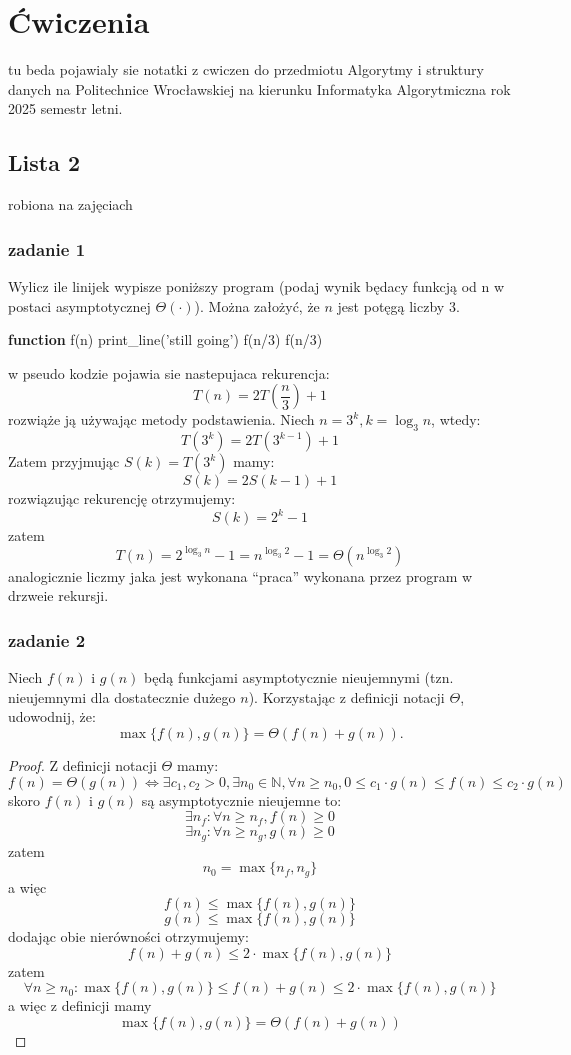 \documentclass[11pt,a4paper]{article}
\begin{document}
\section{Ćwiczenia}
tu beda pojawialy sie notatki z cwiczen do przedmiotu Algorytmy i struktury danych na Politechnice Wrocławskiej na kierunku Informatyka Algorytmiczna rok 2025 semestr letni.

\subsection{Lista 2}
robiona na zajęciach \date{2025-03-10}
\subsubsection{zadanie 1}
Wylicz ile linijek wypisze poniższy program (podaj wynik będacy funkcją od n w postaci asymptotycznej $\Theta(\cdot)$). Można założyć, że $n$ jest potęgą liczby $3$.
\begin{algorithm}
\begin{algorithmic}[1]
\State \textbf{function} f(n)
    \State print\_line('still going')
    \State f(n/3)
    \State f(n/3)
\EndIf
\end{algorithmic}
\end{algorithm}
w pseudo kodzie pojawia sie nastepujaca rekurencja:
\[
    T(n) = 2T(\frac{n}{3}) + 1
\]
rozwiąże ją używając metody podstawienia. Niech $n=3^k, k = \log_3 n$, wtedy:
\[
    T(3^k) = 2T(3^{k-1}) + 1
\]
Zatem przyjmując $S(k) = T(3^k)$ mamy:
\[
    S(k) = 2S(k-1) + 1
\]
rozwiązując rekurencję otrzymujemy:
\[
    S(k) = 2^k - 1
\]
zatem
\[
    T(n) = 2^{\log_3 n} - 1 = n^{\log_3 2} - 1 = \Theta(n^{\log_3 2})
\]
analogicznie liczmy jaka jest wykonana ``praca'' wykonana przez program w drzweie rekursji.

\subsubsection{zadanie 2}
Niech $f(n)$ i $g(n)$ będą funkcjami asymptotycznie nieujemnymi (tzn. nieujemnymi dla dostatecznie dużego $n$). Korzystając z definicji notacji $\Theta$, udowodnij, że:
\[
\max\{f(n), g(n)\} = \Theta(f(n) + g(n)).
\]
\begin{proof}
    Z definicji notacji $\Theta$ mamy:
    \[
        f(n)=\Theta(g(n)) \iff \exists c_1, c_2 > 0, \exists n_0 \in \mathbb{N}, \forall n \geq n_0, 0 \leq c_1 \cdot g(n) \leq f(n) \leq c_2 \cdot g(n)
    \]
    skoro $f(n)$ i $g(n)$ są asymptotycznie nieujemne to:
    \[
        \exists n_f: \forall n \geq n_f, f(n) \geq 0
    \]
    \[
        \exists n_g: \forall n \geq n_g, g(n) \geq 0
    \]
    zatem
    \[
        n_0=\max\{n_f, n_g\}
    \]
    a więc
    \[
        f(n) \leq \max\{f(n), g(n)\}
    \]
    \[
        g(n) \leq \max\{f(n), g(n)\}
    \]
    dodając obie nierówności otrzymujemy:
    \[
        f(n) + g(n) \leq 2 \cdot \max\{f(n), g(n)\}
    \]
    zatem
    \[
        \forall n \geq n_0: \max\{f(n), g(n)\} \leq f(n) + g(n) \leq 2 \cdot \max\{f(n), g(n)\}
    \]
    a więc z definicji mamy
    \[
        \max\{f(n), g(n)\} = \Theta(f(n) + g(n))
    \]
\end{proof}
\end{document}
